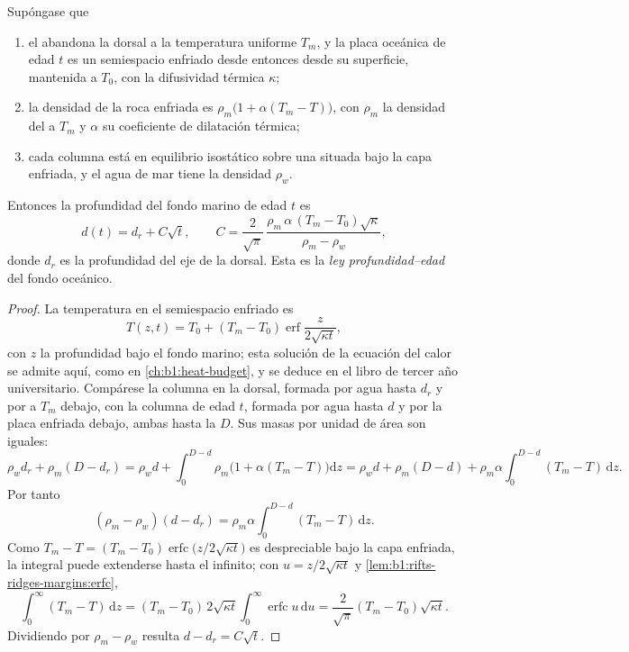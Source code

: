 \begin{theorem}\label{thm:b1:rifts-ridges-margins:depth-age}
Supóngase que
\begin{enumerate}
  \item el  abandona la dorsal a la temperatura uniforme $T_m$, y la placa oceánica de edad $t$ es un semiespacio enfriado desde
        entonces desde su superficie, mantenida a $T_0$, con la difusividad térmica $\kappa$;
  \item la densidad de la roca enfriada es $\rho_m\bigl(1 + \alpha(T_m -
        T)\bigr)$, con $\rho_m$ la densidad del  a $T_m$ y
        $\alpha$ su coeficiente de dilatación térmica;
  \item cada columna está en equilibrio isostático sobre una  situada bajo la capa enfriada, y el agua de mar
        tiene la densidad $\rho_w$.
\end{enumerate}
Entonces la profundidad del fondo marino de edad $t$ es
\[
  d(t) = d_r + C\sqrt t, \qquad
  C = \frac{2}{\sqrt\pi}\,\frac{\rho_m\,\alpha\,(T_m - T_0)\sqrt\kappa}{\rho_m - \rho_w},
\]
donde $d_r$ es la profundidad del eje de la dorsal. Esta es la \emph{ley profundidad--edad} del fondo oceánico.
\end{theorem}

\begin{proof}
La temperatura en el semiespacio enfriado es
\[
  T(z, t) = T_0 + (T_m - T_0)\operatorname{erf}\frac{z}{2\sqrt{\kappa t}},
\]
con $z$ la profundidad bajo el fondo marino; esta solución de la ecuación del calor se admite aquí, como en \cref{ch:b1:heat-budget}, y se
deduce en el libro de tercer año universitario. Compárese la columna en la dorsal, formada por agua hasta $d_r$ y por  a $T_m$ debajo,
con la columna de edad $t$, formada por agua hasta $d$ y por la placa enfriada debajo, ambas hasta la  $D$. Sus
masas por unidad de área son iguales:
\[
  \rho_w d_r + \rho_m (D - d_r) = \rho_w d + \int_0^{D-d}\rho_m\bigl(1 + \alpha(T_m - T)\bigr)\mathrm dz
  = \rho_w d + \rho_m (D - d) + \rho_m\alpha\int_0^{D-d}(T_m - T)\,\mathrm dz.
\]
Por tanto
\[
  (\rho_m - \rho_w)(d - d_r) = \rho_m\alpha\int_0^{D-d}(T_m - T)\,\mathrm dz.
\]
Como $T_m - T = (T_m - T_0)\operatorname{erfc}\bigl(z/2\sqrt{\kappa t}\bigr)$ es despreciable bajo la capa enfriada, la integral puede
extenderse hasta el infinito; con $u = z/2\sqrt{\kappa t}$ y \cref{lem:b1:rifts-ridges-margins:erfc},
\[
  \int_0^\infty (T_m - T)\,\mathrm dz = (T_m - T_0)\,2\sqrt{\kappa t}\int_0^\infty\operatorname{erfc}u\,\mathrm du
  = \frac{2}{\sqrt\pi}(T_m - T_0)\sqrt{\kappa t}.
\]
Dividiendo por $\rho_m - \rho_w$ resulta $d - d_r = C\sqrt t$.
\end{proof}

